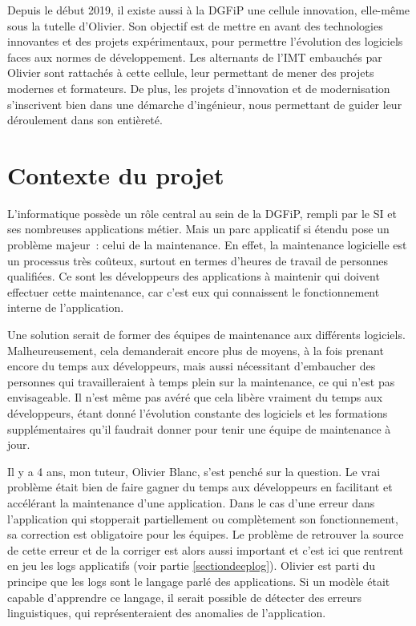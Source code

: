 \documentclass[openany, 11pt]{memoir}
\begin{document}
\bigskip
Depuis le début 2019, il existe aussi à la DGFiP une cellule innovation, elle-même sous la tutelle d'Olivier. Son objectif est de mettre en avant des technologies innovantes et des projets expérimentaux, pour permettre l'évolution des logiciels faces aux normes de développement. Les alternants de l'IMT embauchés par Olivier sont rattachés à cette cellule, leur permettant de mener des projets modernes et formateurs. De plus, les projets d'innovation et de modernisation s'inscrivent bien dans une démarche d'ingénieur, nous permettant de guider leur déroulement dans son entièreté.

\newpage
\section{Contexte du projet}

L'informatique possède un rôle central au sein de la \gls{DGFiP}, rempli par le \gls{SI} et ses nombreuses applications métier. Mais un parc applicatif si étendu pose un problème majeur~: celui de la maintenance. En effet, la maintenance logicielle est un processus très coûteux, surtout en termes d'heures de travail de personnes qualifiées. Ce sont les développeurs des applications à maintenir qui doivent effectuer cette maintenance, car c'est eux qui connaissent le fonctionnement interne de l'application.

Une solution serait de former des équipes de maintenance aux différents logiciels. Malheureusement, cela demanderait encore plus de moyens, à la fois prenant encore du temps aux développeurs, mais aussi nécessitant d'embaucher des personnes qui travailleraient à temps plein sur la maintenance, ce qui n'est pas envisageable. Il n'est même pas avéré que cela libère vraiment du temps aux développeurs, étant donné l'évolution constante des logiciels et les formations supplémentaires qu'il faudrait donner pour tenir une équipe de maintenance à jour.

\bigskip
Il y a 4 ans, mon tuteur, Olivier Blanc, s'est penché sur la question. Le vrai problème était bien de faire gagner du temps aux développeurs en facilitant et accélérant la maintenance d'une application. Dans le cas d'une erreur dans l'application qui stopperait partiellement ou complètement son fonctionnement, sa correction est obligatoire pour les équipes. Le problème de retrouver la source de cette erreur et de la corriger est alors aussi important et c'est ici que rentrent en jeu les \glspl{log} applicatifs (voir partie \ref{sectiondeeplog}). Olivier est parti du principe que les logs sont le langage parlé des applications. Si un modèle était capable d'apprendre ce langage, il serait possible de détecter des erreurs linguistiques, qui représenteraient des anomalies de l'application.
\end{document}
